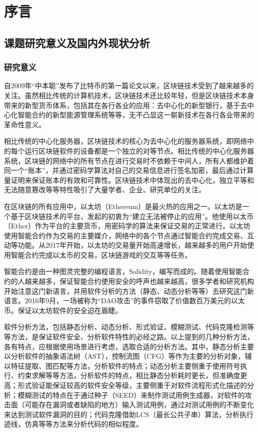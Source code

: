 
\chapter{序言}

\section{课题研究意义及国内外现状分析}

\subsection{研究意义}
自2009年“中本聪”发布了比特币的第一篇论文以来，区块链技术受到了越来越多的关注。虽然相比传统的计算机技术，区块链技术还比较年轻，但是区块链技术本身带来的新型货币体系，包括其在各行各业的应用：去中心化的新型银行\cite{blockchain-application}，基于去中心化智能合约的新型能源管理系统\cite{blockchain-in-energy}等等，无不凸显这一崭新技术在各行各业带来的革命性意义。

相比传统的中心化服务器，区块链技术的核心为去中心化的服务器系统，即网络中的每个运行区块链软件的设备都是一个独立的对等节点\cite{区块链技术及其应用研究}。相比传统的中心化服务器系统，区块链的网络中的所有节点在进行交易时不依赖于中间人，所有人都维护着同一个“账本”，并通过密码学算法对自己的交易信息进行签名加密，最后通过计算量证明来保证账本的有效和可靠性。区块链技术中体现出的去中心化，独立平等和无法随意篡改等等特性吸引了大量学者、企业、研究单位的关注。

在区块链的所有应用中，以太坊（Ethereum）是最火热的应用之一。以太坊是一个基于区块链技术的平台，发起的初衷为“建立无法被停止的应用”\cite{eth-intro}。他使用以太币（Ether）作为平台的主要货币，用密码学的算法来保证交易的正常进行。以太坊使用智能合约作为交易的主要媒介，网络中的各个节点通过智能合约完成交易、互动等功能。从2017年开始，以太坊的交易量开始高速增长\cite{eth-chart}，越来越多的用户开始使用智能合约完成以太币的交易，区块链游戏的交互等等任务。

智能合约是由一种图灵完整的编程语言，Solidity，编写而成的。随着使用智能合约的人越来越多，保证智能合约使用安全的呼声也越来越高，很多学者和研究机构开始注意这门新语言，并用软件分析的方法（静态、动态分析等等）去研究这门新语言。2016年9月，一场被称为“DAO攻击”的事件窃取了价值数百万美元的以太币\cite{dao-attack}。保证以太坊软件的安全迫在眉睫。

软件分析方法，包括静态分析、动态分析、形式验证、模糊测试、代码克隆检测等等方法，是保证软件安全、分析软件特性的必经之路。以上提到的几种分析方法，各有特点，应根据使用场景进行考虑，选取合适的分析方法。其中，静态分析主要以分析软件的抽象语法树（AST），控制流图（CFG）等作为主要的分析对象，辅以特征提取\cite{deckard}、图匹配等方法，分析软件的特点；动态分析主要侧重于使用符号执行、约束求解等等方法，分析软件的特点，相比静态分析耗时更长，但准确度更高；形式验证能保证较高的软件安全等级，主要侧重于对软件流程形式化描述的分析；模糊测试的特点在于通过种子（SEED）来制作测试用例生成器，对软件的攻击面（可能存在漏洞或者缺陷的地方）输入测试用例，通过对测试用例的不断变化来达到测试软件漏洞的目的；代码克隆借助LCS（最长公共子串）算法，分析执行迹线，仿真等等方法来分析代码的相似程度。

